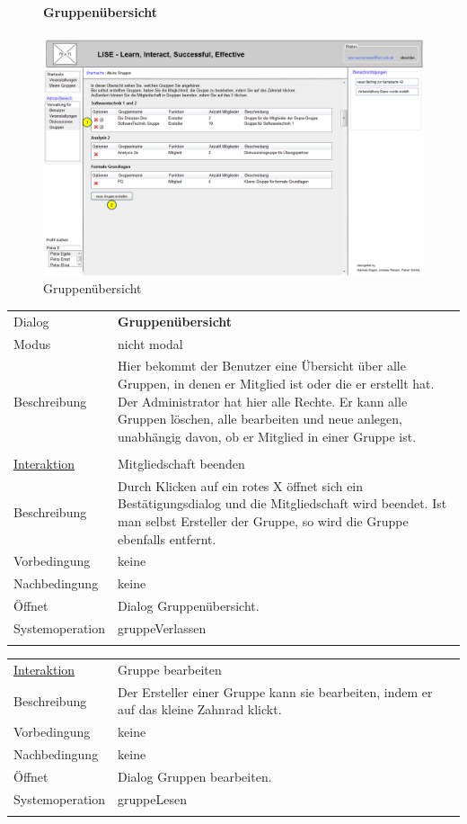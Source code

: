 \documentclass[12pt,a4paper]{article}
\begin{document}
{\begin{figure}[H]
	\paragraph{Gruppenübersicht}
	\includegraphics[width=\textwidth]{Bilder/Mockups/GUI/Gruppenuebersicht.png}
	\caption{Gruppenübersicht}
	\label{GuiGruppenuebersicht}
\end{figure}
\begin{tabular}{l p{12cm}}
	Dialog 	 & \textbf{Gruppenübersicht} \\ 
	Modus & nicht modal\\ 
	Beschreibung   	& Hier bekommt der Benutzer eine Übersicht über alle Gruppen, in denen er Mitglied ist oder die er erstellt hat. Der Administrator hat hier alle Rechte. Er kann alle Gruppen löschen, alle bearbeiten und neue anlegen, unabhängig davon, ob er Mitglied in einer Gruppe ist.\\\\
	
	\underline{Interaktion} 	 & Mitgliedschaft beenden\\ 
	Beschreibung   	& Durch Klicken auf ein rotes X öffnet sich ein Bestätigungsdialog und die Mitgliedschaft wird beendet. Ist man selbst Ersteller der Gruppe, so wird die Gruppe ebenfalls entfernt.\\
	Vorbedingung	& keine \\
	Nachbedingung	& keine \\
	Öffnet			& Dialog \glqq Gruppenübersicht\grqq.\\
	Systemoperation & gruppeVerlassen\\\\
\end{tabular}

\begin{tabular}{l p{12cm}}
	\underline{Interaktion} 	 & Gruppe bearbeiten\\ 
	Beschreibung   	& Der Ersteller einer Gruppe kann sie bearbeiten, indem er auf das kleine Zahnrad klickt.\\
	Vorbedingung	& keine \\
	Nachbedingung	& keine \\
	Öffnet			& Dialog \glqq Gruppen bearbeiten\grqq.\\
	Systemoperation & gruppeLesen\\\\
\end{tabular}

}
\end{document}
